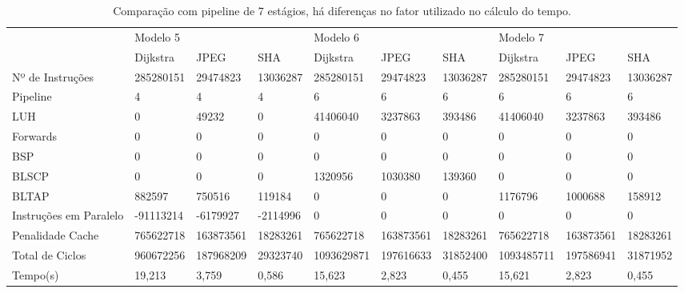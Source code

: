 \documentclass[pdftex,12pt,a4paper]{article}
\begin{document}
\begin{table}[h]
\resizebox{17cm}{!} {
\begin{tabular}{l|lll|lll|lll|}
                       & Modelo 5  &           &          & Modelo 6   &           &          & Modelo 7   &           &          \\
                       & Dijkstra  & JPEG      & SHA      & Dijkstra   & JPEG      & SHA      & Dijkstra   & JPEG      & SHA      \\ \hline
Nº de Instruções       & 285280151 & 29474823  & 13036287 & 285280151  & 29474823  & 13036287 & 285280151  & 29474823  & 13036287 \\
Pipeline               & 4         & 4         & 4        & 6          & 6         & 6        & 6          & 6         & 6        \\
LUH                    & 0         & 49232     & 0        & 41406040   & 3237863   & 393486   & 41406040   & 3237863   & 393486   \\
Forwards               & 0         & 0         & 0        & 0          & 0         & 0        & 0          & 0         & 0        \\
BSP                    & 0         & 0         & 0        & 0          & 0         & 0        & 0          & 0         & 0        \\
BLSCP                  & 0         & 0         & 0        & 1320956    & 1030380   & 139360   & 0          & 0         & 0        \\
BLTAP                  & 882597    & 750516    & 119184   & 0          & 0         & 0        & 1176796    & 1000688   & 158912   \\
Instruções em Paralelo & -91113214 & -6179927  & -2114996 & 0          & 0         & 0        & 0          & 0         & 0        \\
Penalidade Cache       & 765622718 & 163873561 & 18283261 & 765622718  & 163873561 & 18283261 & 765622718  & 163873561 & 18283261 \\ \hline \hline
Total de Ciclos        & 960672256 & 187968209 & 29323740 & 1093629871 & 197616633 & 31852400 & 1093485711 & 197586941 & 31871952 \\
Tempo(s)               & 19,213    & 3,759     & 0,586    & 15,623     & 2,823     & 0,455    & 15,621     & 2,823     & 0,455    \\ \hline
\end{tabular}
}
\caption{Comparação com pipeline de 7 estágios, há diferenças no fator utilizado no cálculo do tempo.}
\label{tab5}
\end{table}
\end{document}
